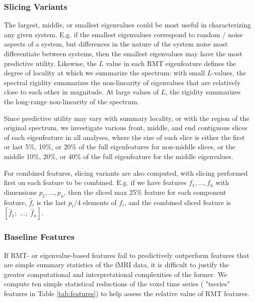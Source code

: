 \documentclass[12pt]{spieman}  %
\begin{document}
\begin{spacing}{2}
\subsubsection{Slicing Variants}

The largest, middle, or smallest eigenvalues could be most useful in
characterizing any given system. E.g. if the smallest eigenvalues correspond to
random / noise aspects of a system, but differences in the nature of the system
noise most differentiate between systems, then the smallest eigenvalues may
have the most predictive utility.  Likewise, the \(L\) value in each RMT
eigenfeature defines the degree of locality at which we summarize the spectrum:
with small \(L\)-values, the spectral rigidity summarizes the non-linearity of
eigenvalues that are relatively close to each other in magnitude. At large
values of \(L\), the rigidity summarizes the long-range non-linearity of the
spectrum.

Since predictive utility may vary with summary locality, or with the region of
the original spectrum, we investigate various front, middle, and end contiguous
slices of each eigenfeature in all analyses, where the size of each slice is
either the first or last 5\%, 10\%, or 20\% of the full eigenfeatures for
non-middle slices, or the middle 10\%, 20\%, or 40\% of the full eigenfeature for
the middle eigenvalues.

For combined features, slicing variants are also computed, with slicing
performed first on each feature to be combined. E.g. if we have features \(f_1,
\dots,  f_n\) with dimensions \(p_1, \dots, p_n\), then the sliced max 25\%
feature for each component feature, \(\hat{f}_i\) is the last \(p_i / 4\)
elements of \(f_i\), and the combined sliced feature is  \([\hat{f}_1;\;
\dots;\; \hat{f}_n]\).


\subsubsection{Baseline Features}
\label{sec:baselines}

If RMT- or eigenvalue-based features fail to predictively outperform features
that are simple summary statistics of the fMRI data, it is difficult to justify
the greater computational and interpretational complexities of the former. We
compute ten simple statistical reductions of the voxel time series ( "tseries"
features in Table \ref{tab:features}) to help assess the relative value of RMT
features.


\end{spacing}
\end{document}
